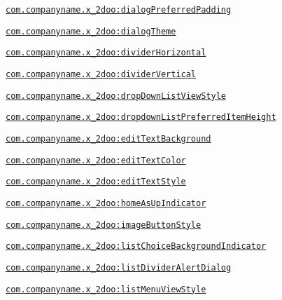 {\tt \hyperlink{classandroid_1_1support_1_1v4_1_1_r_1_1styleable_6100ebfbe6b8c50952783dcdd55473e4}{com.companyname.x\_\-2doo:dialogPreferredPadding}}

{\tt \hyperlink{classandroid_1_1support_1_1v4_1_1_r_1_1styleable_7b06171d505e781dc07ea55c3ea49e83}{com.companyname.x\_\-2doo:dialogTheme}}

{\tt \hyperlink{classandroid_1_1support_1_1v4_1_1_r_1_1styleable_e74ae6f850a84137337f5a8fc61e97a0}{com.companyname.x\_\-2doo:dividerHorizontal}}

{\tt \hyperlink{classandroid_1_1support_1_1v4_1_1_r_1_1styleable_2cbf4f6a6038a3c0ee43fa2d8baf13be}{com.companyname.x\_\-2doo:dividerVertical}}

{\tt \hyperlink{classandroid_1_1support_1_1v4_1_1_r_1_1styleable_7f77b4643b5ac4aa9e62aa4fc9232548}{com.companyname.x\_\-2doo:dropDownListViewStyle}}

{\tt \hyperlink{classandroid_1_1support_1_1v4_1_1_r_1_1styleable_a0ae883a1cfc49924dd71cb9014f35b6}{com.companyname.x\_\-2doo:dropdownListPreferredItemHeight}}

{\tt \hyperlink{classandroid_1_1support_1_1v4_1_1_r_1_1styleable_1e59b88c396599d1ced4caa57c2a7264}{com.companyname.x\_\-2doo:editTextBackground}}

{\tt \hyperlink{classandroid_1_1support_1_1v4_1_1_r_1_1styleable_11e77e8da745db12ac42b8308e77940e}{com.companyname.x\_\-2doo:editTextColor}}

{\tt \hyperlink{classandroid_1_1support_1_1v4_1_1_r_1_1styleable_be5ae2f20868c09eec22ffbecbfd4bd3}{com.companyname.x\_\-2doo:editTextStyle}}

{\tt \hyperlink{classandroid_1_1support_1_1v4_1_1_r_1_1styleable_760d4c63c4342ad1814a4021ddbaf121}{com.companyname.x\_\-2doo:homeAsUpIndicator}}

{\tt \hyperlink{classandroid_1_1support_1_1v4_1_1_r_1_1styleable_55a07b8f677eb6c8883891c1f2cfcf74}{com.companyname.x\_\-2doo:imageButtonStyle}}

{\tt \hyperlink{classandroid_1_1support_1_1v4_1_1_r_1_1styleable_04b55514ebd83ea5a03fba7aec47f213}{com.companyname.x\_\-2doo:listChoiceBackgroundIndicator}}

{\tt \hyperlink{classandroid_1_1support_1_1v4_1_1_r_1_1styleable_76eadcfe0bf32602bc65706cb1655757}{com.companyname.x\_\-2doo:listDividerAlertDialog}}

{\tt \hyperlink{classandroid_1_1support_1_1v4_1_1_r_1_1styleable_1b00f2d6ba69378b7ec0cfccf25c0f46}{com.companyname.x\_\-2doo:listMenuViewStyle}}

